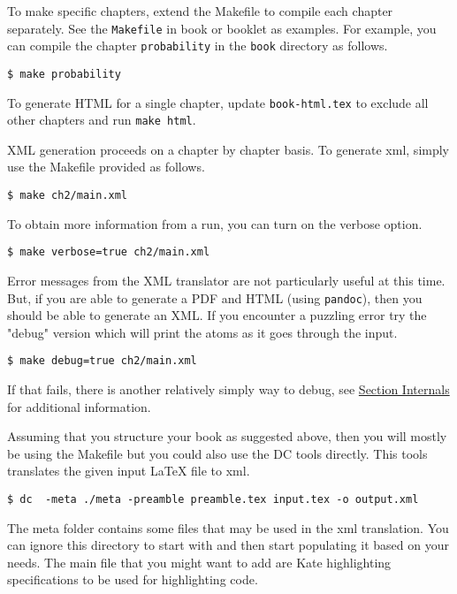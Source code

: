 \begin{gram}
To make specific chapters,  extend the Makefile to compile each chapter separately.  See the \lstinline`Makefile` in book or booklet as examples.
%
For example, you can compile the chapter \lstinline`probability` in the \lstinline`book` directory as follows.
\begin{lstlisting}
$ make probability
\end{lstlisting}

To generate HTML for a single chapter, update \lstinline`book-html.tex` to exclude all other chapters and run \lstinline`make html`.

\end{gram}


\begin{gram}
XML generation proceeds on a chapter by chapter basis.
%
To generate xml, simply use the Makefile provided as follows.
%
\begin{lstlisting}
$ make ch2/main.xml
\end{lstlisting}
%

To obtain more information from a run, you can turn on the verbose option.
%
\begin{lstlisting}
$ make verbose=true ch2/main.xml
\end{lstlisting}
\end{gram}

\begin{gram}
Error messages from the XML translator are not particularly useful at this time.  But, if you are able to generate a PDF and HTML (using \lstinline`pandoc`), then you should be able to generate an XML. 
%
If you encounter a puzzling error try the "debug" version which will print the atoms as it goes through the input.
%
\begin{lstlisting}
$ make debug=true ch2/main.xml
\end{lstlisting}

If that fails, there is another relatively simply way to debug, see \href{sec:dc::internals}{Section Internals} for additional information.
\end{gram}

\begin{gram}
Assuming that you structure your book as suggested above, then you will mostly be using the Makefile but you could also use the DC tools directly. 
%
This tools translates the given input LaTeX file to xml.

\begin{lstlisting}
$ dc  -meta ./meta -preamble preamble.tex input.tex -o output.xml
\end{lstlisting}

The meta folder contains some files that may be used in the xml translation.  You can ignore this directory to start with and then start populating it based on your needs.  The main file that you might want to add are Kate highlighting specifications to be used for highlighting code.
\end{gram}


